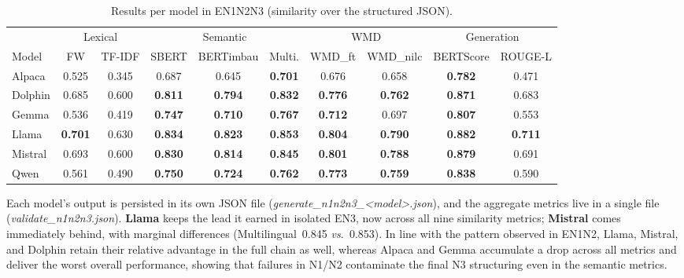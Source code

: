 \documentclass[a4paper,fleqn]{cas-sc}
\newcommand{\melhor}[1]{\textcolor{green!55!black}{#1}}
\newcommand{\pior}[1]{\textcolor{red!80!black}{#1}}
\begin{document}
\begin{table}[ht]
\centering
\caption{Results per model in EN1N2N3 (similarity over the structured JSON).}
\label{tab:resultados_en1n2n3}
\scriptsize
\begin{tabular}{lccccccccc}
\hline
 & \multicolumn{2}{c}{Lexical} & \multicolumn{3}{c}{Semantic} & \multicolumn{2}{c}{WMD} & \multicolumn{2}{c}{Generation} \\
\cline{2-3}\cline{4-6}\cline{7-8}\cline{9-10}
Model & FW & TF-IDF & SBERT & BERTimbau & Multi. & WMD\_ft & WMD\_nilc & BERTScore & ROUGE-L \\
\hline
Alpaca  & \pior{0.525} & \pior{0.345} & \pior{0.687} & \pior{0.645} & \pior{\textbf{0.701}} & \pior{0.676} & \pior{0.658} & \pior{\textbf{0.782}} & \pior{0.471} \\
Dolphin & 0.685 & 0.600 & \textbf{0.811} & \textbf{0.794} & \textbf{0.832} & \textbf{0.776} & \textbf{0.762} & \textbf{0.871} & 0.683 \\
Gemma   & 0.536 & 0.419 & \textbf{0.747} & \textbf{0.710} & \textbf{0.767} & \textbf{0.712} & 0.697 & \textbf{0.807} & 0.553 \\
Llama   & \melhor{\textbf{0.701}} & \melhor{0.630} & \melhor{\textbf{0.834}} & \melhor{\textbf{0.823}} & \melhor{\textbf{0.853}} & \melhor{\textbf{0.804}} & \melhor{\textbf{0.790}} & \melhor{\textbf{0.882}} & \melhor{\textbf{0.711}} \\
Mistral & 0.693 & 0.600 & \textbf{0.830} & \textbf{0.814} & \textbf{0.845} & \textbf{0.801} & \textbf{0.788} & \textbf{0.879} & 0.691 \\
Qwen    & 0.561 & 0.490 & \textbf{0.750} & \textbf{0.724} & \textbf{0.762} & \textbf{0.773} & \textbf{0.759} & \textbf{0.838} & 0.590 \\
\hline
\end{tabular}
\end{table}

Each model's output is persisted in its own JSON file (\textit{generate\_n1n2n3\_<model>.json}), and the aggregate metrics live in a single file (\textit{validate\_n1n2n3.json}). \textbf{Llama} keeps the lead it earned in isolated EN3, now across all nine similarity metrics; \textbf{Mistral} comes immediately behind, with marginal differences (Multilingual~0.845 \textit{vs.}~0.853). In line with the pattern observed in EN1N2, Llama, Mistral, and Dolphin retain their relative advantage in the full chain as well, whereas Alpaca and Gemma accumulate a drop across all metrics and deliver the worst overall performance, showing that failures in N1/N2 contaminate the final N3 structuring even in the semantic metrics.
\end{document}
